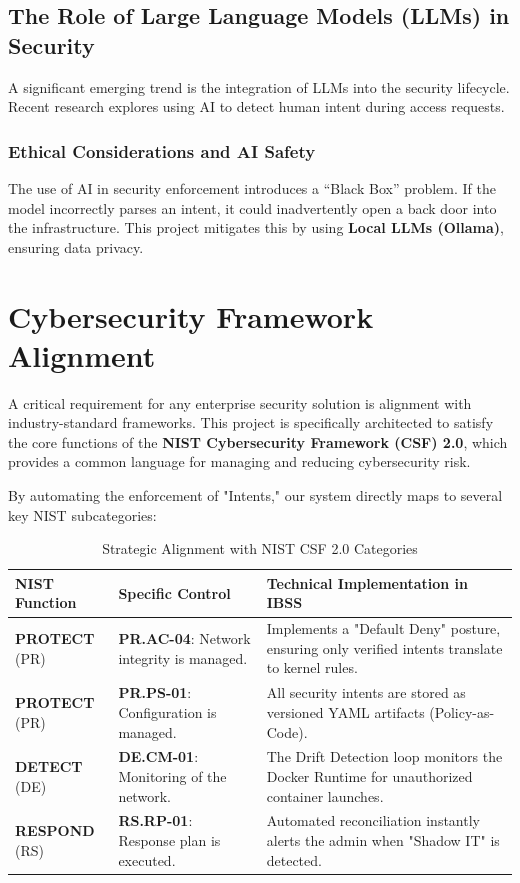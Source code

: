 \documentclass[12pt,a4paper]{article}
\begin{document}
\subsection{The Role of Large Language Models (LLMs) in Security}
A significant emerging trend is the integration of LLMs into the security lifecycle. Recent research \cite{ijcesen2023intent} explores using AI to detect human intent during access requests.

\subsubsection{Ethical Considerations and AI Safety}
The use of AI in security enforcement introduces a ``Black Box'' problem. If the model incorrectly parses an intent, it could inadvertently open a back door into the infrastructure. This project mitigates this by using \textbf{Local LLMs (Ollama)}, ensuring data privacy.

\newpage

\section{Cybersecurity Framework Alignment}
A critical requirement for any enterprise security solution is alignment with industry-standard frameworks. This project is specifically architected to satisfy the core functions of the \textbf{NIST Cybersecurity Framework (CSF) 2.0}, which provides a common language for managing and reducing cybersecurity risk.

By automating the enforcement of "Intents," our system directly maps to several key NIST subcategories:

\begin{table}[H]
\centering
\caption{Strategic Alignment with NIST CSF 2.0 Categories}
\begin{tabularx}{\textwidth}{@{} l X X @{}}
\toprule
\textbf{NIST Function} & \textbf{Specific Control} & \textbf{Technical Implementation in IBSS} \\ \midrule
\textbf{PROTECT} (PR) & \textbf{PR.AC-04}: Network integrity is managed. & Implements a "Default Deny" posture, ensuring only verified intents translate to kernel rules. \\ \midrule
\textbf{PROTECT} (PR) & \textbf{PR.PS-01}: Configuration is managed. & All security intents are stored as versioned YAML artifacts (Policy-as-Code). \\ \midrule
\textbf{DETECT} (DE) & \textbf{DE.CM-01}: Monitoring of the network. & The Drift Detection loop monitors the Docker Runtime for unauthorized container launches. \\ \midrule
\textbf{RESPOND} (RS) & \textbf{RS.RP-01}: Response plan is executed. & Automated reconciliation instantly alerts the admin when "Shadow IT" is detected. \\ \bottomrule
\end{tabularx}
\end{table}
\end{document}
